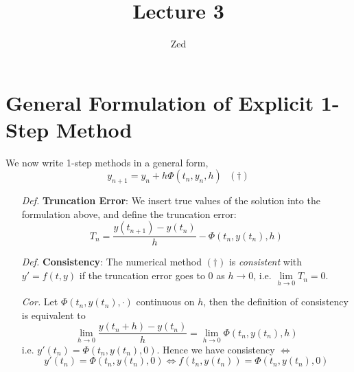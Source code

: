 \documentclass[a4paper, 11pt]{article}
\title{\textbf{Lecture 3}}
\author{Zed}
\begin{document}
\maketitle

\section{General Formulation of Explicit 1-Step Method}
We now write 1-step methods in a general form,
$$
y_{n+1} = y_n + h\Phi(t_n, y_n, h)~~~(\dag)
$$
\begin{itemize}
	\item[\textit{Def.}] \textbf{Truncation Error}: We insert true values of the solution into the formulation above, and define the truncation error:
	$$
	T_n = \frac{y(t_{n+1})-y(t_n)}{h} - \Phi(t_n, y(t_n), h)
	$$
	\item[\textit{Def.}] \textbf{Consistency}: The numerical method $(\dag)$ is \emph{consistent} with $y'=f(t,y)$ if the truncation error goes to $0$ as $h\to 0$, i.e. $\lim\limits_{h\rightarrow0}T_n = 0$. 

	\item[\textit{Cor.}] Let $\Phi(t_n, y(t_n), \cdot)$ continuous on $h$, then the definition of consistency is equivalent to
	$$
	\lim\limits_{h\rightarrow 0}\frac{y(t_{n}+h)-y(t_n)}{h} = \lim\limits_{h\rightarrow 0} \Phi(t_n, y(t_n), h)
	$$
	i.e. $y'(t_n) = \Phi(t_n, y(t_n), 0)$. Hence we have consistency $\iff$
	$$
	y'(t_n) = \Phi(t_n, y(t_n), 0) \iff f(t_n, y(t_n)) = \Phi(t_n, y(t_n), 0)
	$$


\end{itemize}
\end{document}
